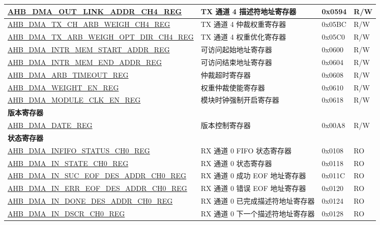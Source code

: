 \begin{longtable}{ | l | l | p{1.3cm} | l | }
\hyperref[regdesc:AHBDMAOUTLINKADDRCHNREG]{AHB\_DMA\_OUT\_LINK\_ADDR\_CH4\_REG} & TX 通道 4 描述符地址寄存器 & 0x0594 & R/W    \\ \hline
\hyperref[regdesc:AHBDMATXCHARBWEIGHCHNREG]{AHB\_DMA\_TX\_CH\_ARB\_WEIGH\_CH4\_REG} & TX 通道 4 仲裁权重寄存器 & 0x05BC & R/W    \\ \hline
\hyperref[regdesc:AHBDMATXARBWEIGHOPTDIRCHNREG]{AHB\_DMA\_TX\_ARB\_WEIGH\_OPT\_DIR\_CH4\_REG} & TX 通道 4 权重优化寄存器 & 0x05C0 & R/W    \\ \hline
\hyperref[regdesc:AHBDMAINTRMEMSTARTADDRREG]{AHB\_DMA\_INTR\_MEM\_START\_ADDR\_REG} & 可访问起始地址寄存器 & 0x0600 & R/W    \\ \hline
\hyperref[regdesc:AHBDMAINTRMEMENDADDRREG]{AHB\_DMA\_INTR\_MEM\_END\_ADDR\_REG} & 可访问结束地址寄存器 & 0x0604 & R/W    \\ \hline
\hyperref[regdesc:AHBDMAARBTIMEOUTREG]{AHB\_DMA\_ARB\_TIMEOUT\_REG} & 仲裁超时寄存器 & 0x0608 & R/W    \\ \hline
\hyperref[regdesc:AHBDMAWEIGHTENREG]{AHB\_DMA\_WEIGHT\_EN\_REG} & 权重仲裁使能寄存器 & 0x0610 & R/W    \\ \hline
\hyperref[regdesc:AHBDMAMODULECLKENREG]{AHB\_DMA\_MODULE\_CLK\_EN\_REG} & 模块时钟强制开启寄存器 & 0x0618 & R/W    \\ \hline
\multicolumn{4}{|l|}{\textbf{版本寄存器}} \\ \hline
\hyperref[regdesc:AHBDMADATEREG]{AHB\_DMA\_DATE\_REG} & 版本控制寄存器 & 0x00A8 & R/W    \\ \hline
\multicolumn{4}{|l|}{\textbf{状态寄存器}} \\ \hline
\hyperref[regdesc:AHBDMAINFIFOSTATUSCHNREG]{AHB\_DMA\_INFIFO\_STATUS\_CH0\_REG} & RX 通道 0 FIFO 状态寄存器 & 0x0108 & RO    \\ \hline
\hyperref[regdesc:AHBDMAINSTATECHNREG]{AHB\_DMA\_IN\_STATE\_CH0\_REG} & RX 通道 0 状态寄存器 & 0x0118 & RO    \\ \hline
\hyperref[regdesc:AHBDMAINSUCEOFDESADDRCHNREG]{AHB\_DMA\_IN\_SUC\_EOF\_DES\_ADDR\_CH0\_REG} & RX 通道 0 成功 EOF 地址寄存器 & 0x011C & RO    \\ \hline
\hyperref[regdesc:AHBDMAINERREOFDESADDRCHNREG]{AHB\_DMA\_IN\_ERR\_EOF\_DES\_ADDR\_CH0\_REG} & RX 通道 0 错误 EOF 地址寄存器 & 0x0120 & RO    \\ \hline
\hyperref[regdesc:AHBDMAINDONEDESADDRCHNREG]{AHB\_DMA\_IN\_DONE\_DES\_ADDR\_CH0\_REG} & RX 通道 0 已完成描述符地址寄存器 & 0x0124 & RO    \\ \hline
\hyperref[regdesc:AHBDMAINDSCRCHNREG]{AHB\_DMA\_IN\_DSCR\_CH0\_REG} & RX 通道 0 下一个描述符地址寄存器 & 0x0128 & RO    \\ \hline

\end{longtable}
